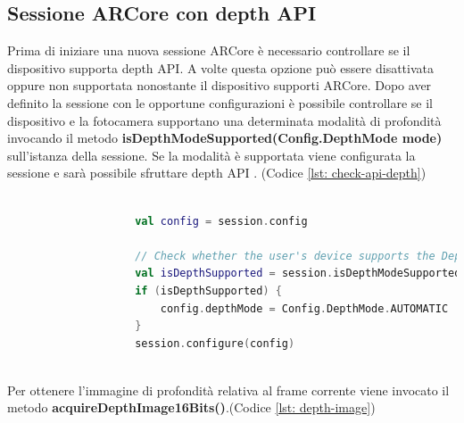 \documentclass[crop=false, class=book]{standalone}
\begin{document}
		\clearpage
		
		\subsection{Sessione ARCore con depth API}
		
			Prima di iniziare una nuova sessione ARCore è necessario controllare se il dispositivo supporta depth API. A volte questa opzione può essere disattivata oppure non supportata nonostante il dispositivo supporti ARCore. Dopo aver definito la sessione con le opportune configurazioni è possibile controllare se il dispositivo e la fotocamera supportano una determinata modalità di profondità invocando il metodo \textbf{isDepthModeSupported(Config.DepthMode mode)} sull'istanza della sessione. Se la modalità è supportata viene configurata la sessione e sarà possibile sfruttare depth API \cite{google2022depth}. (Codice \vref{lst: check-api-depth})\\
		
			\begin{center}
				\begin{minipage}{0.95\textwidth}
					\begin{lstlisting}[caption={ Controllo supporto depth API}, label={lst: check-api-depth}, language=Kotlin]
				
					val config = session.config

					// Check whether the user's device supports the Depth API.
					val isDepthSupported = session.isDepthModeSupported(Config.DepthMode.AUTOMATIC)
					if (isDepthSupported) {
  						config.depthMode = Config.DepthMode.AUTOMATIC
					}
					session.configure(config)
				
					\end{lstlisting}
			\end{minipage}
		\end{center}
		
		\begin{flushleft}
		Per ottenere l'immagine di profondità relativa al frame corrente viene invocato il metodo \textbf{acquireDepthImage16Bits()}.(Codice \vref{lst: depth-image})\\
		\end{flushleft}
		
\end{document}
